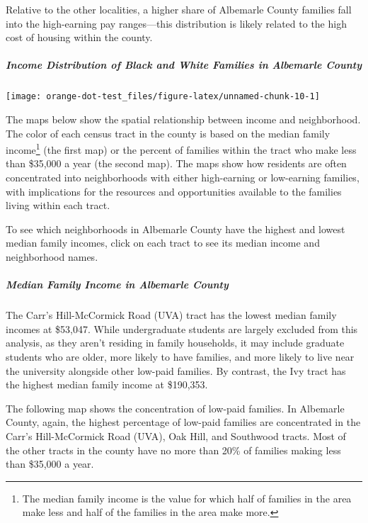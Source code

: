 \documentclass[
]{article}
\begin{document}
Relative to the other localities, a higher share of Albemarle County
families fall into the high-earning pay ranges---this distribution is
likely related to the high cost of housing within the county.

\hypertarget{income-distribution-of-black-and-white-families-in-albemarle-county}{%
\subparagraph{Income Distribution of Black and White Families in
Albemarle
County}\label{income-distribution-of-black-and-white-families-in-albemarle-county}}

\begin{center}\texttt{[image: orange-dot-test\_files/figure-latex/unnamed-chunk-10-1]} \end{center}

The maps below show the spatial relationship between income and
neighborhood. The color of each census tract in the county is based on
the median family income\footnote{The median family income is the value
  for which half of families in the area make less and half of the
  families in the area make more.} (the first map) or the percent of
families within the tract who make less than \$35,000 a year (the second
map). The maps show how residents are often concentrated into
neighborhoods with either high-earning or low-earning families, with
implications for the resources and opportunities available to the
families living within each tract.

To see which neighborhoods in Albemarle County have the highest and
lowest median family incomes, click on each tract to see its median
income and neighborhood names.

\hypertarget{median-family-income-in-albemarle-county}{%
\subparagraph{Median Family Income in Albemarle
County}\label{median-family-income-in-albemarle-county}}

The Carr's Hill-McCormick Road (UVA) tract has the lowest median family
incomes at \$53,047. While undergraduate students are largely excluded
from this analysis, as they aren't residing in family households, it may
include graduate students who are older, more likely to have families,
and more likely to live near the university alongside other low-paid
families. By contrast, the Ivy tract has the highest median family
income at \$190,353.

The following map shows the concentration of low-paid families. In
Albemarle County, again, the highest percentage of low-paid families are
concentrated in the Carr's Hill-McCormick Road (UVA), Oak Hill, and
Southwood tracts. Most of the other tracts in the county have no more
than 20\% of families making less than \$35,000 a year.
\end{document}
